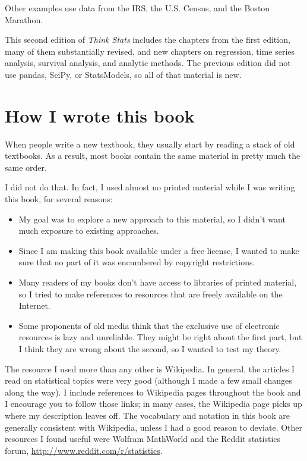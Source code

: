 \documentclass[12pt]{book}
\theoremstyle{exercise}
\begin{document}
Other examples use data from the IRS, the U.S. Census, and
the Boston Marathon.

This second edition of {\it Think Stats\/} includes the chapters from
the first edition, many of them substantially revised, and new
chapters on regression, time series analysis, survival analysis,
and analytic methods.  The previous edition did not use pandas,
SciPy, or StatsModels, so all of that material is new.


\section{How I wrote this book}

When people write a new textbook, they usually start by
reading a stack of old textbooks.  As a result, most books
contain the same material in pretty much the same order.

I did not do that.  In fact, I used almost no printed material while I
was writing this book, for several reasons:

\begin{itemize}

\item My goal was to explore a new approach to this material, so I didn't
want much exposure to existing approaches.

\item Since I am making this book available under a free license, I wanted
to make sure that no part of it was encumbered by copyright restrictions.

\item Many readers of my books don't have access to libraries of
printed material, so I tried to make references to resources that are
freely available on the Internet.

\item Some proponents of old media think that the exclusive
use of electronic resources is lazy and unreliable.  They might be right
about the first part, but I think they are wrong about the second, so
I wanted to test my theory.


\end{itemize}

The resource I used more than any other is Wikipedia.  In general, the
articles I read on statistical topics were very good (although I made
a few small changes along the way).  I include references to Wikipedia
pages throughout the book and I encourage you to follow those links;
in many cases, the Wikipedia page picks up where my description leaves
off.  The vocabulary and notation in this book are generally
consistent with Wikipedia, unless I had a good reason to deviate.
Other resources I found useful were Wolfram MathWorld and 
the Reddit statistics forum, \url{http://www.reddit.com/r/statistics}.
\end{document}
